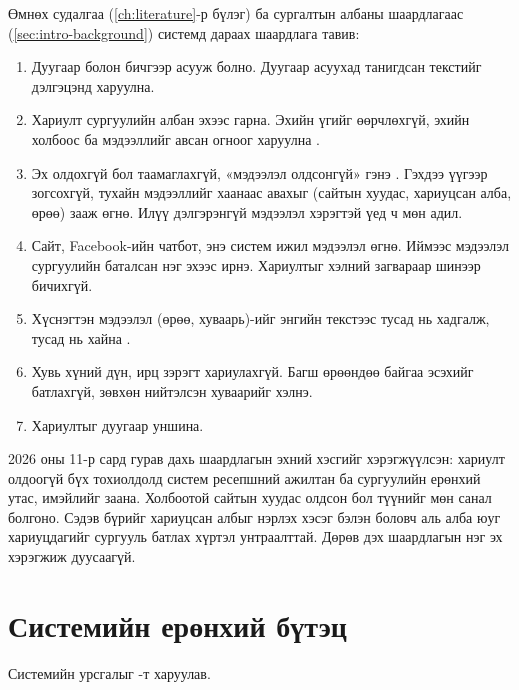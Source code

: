 Өмнөх судалгаа (\ref{ch:literature}-р бүлэг) ба сургалтын албаны шаардлагаас (\ref{sec:intro-background}) системд дараах шаардлага тавив:
\begin{enumerate}
    \item Дуугаар болон бичгээр асууж болно. Дуугаар асуухад танигдсан текстийг дэлгэцэнд харуулна.
    \item Хариулт сургуулийн албан эхээс гарна. Эхийн үгийг өөрчлөхгүй, эхийн холбоос ба мэдээллийг авсан огноог харуулна \cite{antico2024unimib,luger2016badpa}.
    \item Эх олдохгүй бол таамаглахгүй, «мэдээлэл олдсонгүй» гэнэ \cite{rajpurkar2018squad2,trienes2025marcel}. Гэхдээ үүгээр зогсохгүй, тухайн мэдээллийг хаанаас авахыг (сайтын хуудас, хариуцсан алба, өрөө) зааж өгнө. Илүү дэлгэрэнгүй мэдээлэл хэрэгтэй үед ч мөн адил.
    \item Сайт, Facebook-ийн чатбот, энэ систем ижил мэдээлэл өгнө. Иймээс мэдээлэл сургуулийн баталсан нэг эхээс ирнэ. Хариултыг хэлний загвараар шинээр бичихгүй.
    \item Хүснэгтэн мэдээлэл (өрөө, хуваарь)-ийг энгийн текстээс тусад нь хадгалж, тусад нь хайна \cite{tao2025aloha}.
    \item Хувь хүний дүн, ирц зэрэгт хариулахгүй. Багш өрөөндөө байгаа эсэхийг батлахгүй, зөвхөн нийтэлсэн хуваарийг хэлнэ.
    \item Хариултыг дуугаар уншина.
\end{enumerate}
2026 оны 11-р сард гурав дахь шаардлагын эхний хэсгийг хэрэгжүүлсэн: хариулт олдоогүй бүх тохиолдолд систем ресепшний ажилтан ба сургуулийн ерөнхий утас, имэйлийг заана. Холбоотой сайтын хуудас олдсон бол түүнийг мөн санал болгоно. Сэдэв бүрийг хариуцсан албыг нэрлэх хэсэг бэлэн боловч аль алба юуг хариуцдагийг сургууль батлах хүртэл унтраалттай. Дөрөв дэх шаардлагын нэг эх хэрэгжиж дуусаагүй.

\section{Системийн ерөнхий бүтэц}
\label{sec:system}

Системийн урсгалыг -т харуулав.


